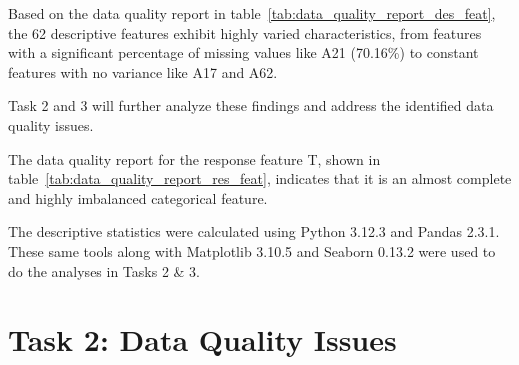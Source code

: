 \documentclass[11pt]{report}
\begin{document}
Based on the data quality report in table~\ref{tab:data_quality_report_des_feat}, the 62 descriptive features exhibit highly varied characteristics,
from features with a significant percentage of missing values like A21 (70.16\%) to constant features with no variance like A17 and A62.

Task 2 and 3 will further analyze these findings and address the identified data quality issues.

\begin{table}[H]
\centering
\caption{Data Quality Report for the Response Feature.}
\label{tab:data_quality_report_res_feat}
\end{table}

The data quality report for the response feature T, shown in table~\ref{tab:data_quality_report_res_feat}, indicates that it is an almost complete and highly imbalanced categorical feature.

The descriptive statistics were calculated using Python 3.12.3 and Pandas 2.3.1. These same tools along with Matplotlib 3.10.5 and Seaborn 0.13.2 were used to do the analyses in Tasks 2 \& 3.


\section*{Task 2: Data Quality Issues}
\end{document}
